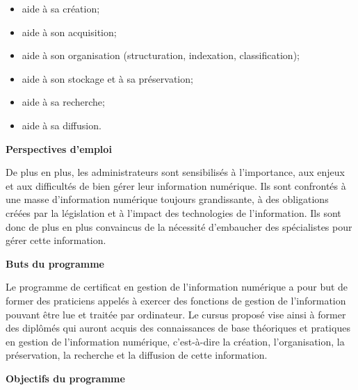 \documentclass [12 pt]{article}
\begin{document}
        \begin{itemize}
        
                
        \item aide à sa création;
                
        \item aide à son acquisition;
                
        \item aide à son organisation (structuration, indexation, classification);
                
        \item aide à son stockage et à sa préservation;
                
        \item aide à sa recherche;
                
        \item aide à sa diffusion.
            
        \end{itemize}
    
            
        \textbf{
        Perspectives d'emploi
        }
    
            De plus en plus, les administrateurs sont sensibilisés à l'importance, aux enjeux et
                aux difficultés de bien gérer leur information numérique. Ils sont confrontés à une
                masse d'information numérique toujours grandissante, à des obligations créées par la
                législation et à l'impact des technologies de l'information. Ils sont donc de plus
                en plus convaincus de la nécessité d'embaucher des spécialistes pour gérer cette
                information.
            
        \textbf{
        Buts du programme
        }
    
            Le programme de certificat en gestion de l'information numérique a pour but de former
                des praticiens appelés à exercer des fonctions de gestion de l'information pouvant
                être lue et traitée par ordinateur.
            Le cursus proposé vise ainsi à former des diplômés qui auront acquis des
                connaissances de base théoriques et pratiques en gestion de l'information numérique,
                c'est-à-dire la création, l'organisation, la préservation, la recherche et la
                diffusion de cette information.
            
        \textbf{
        Objectifs du programme
        }
    
\end{document}
